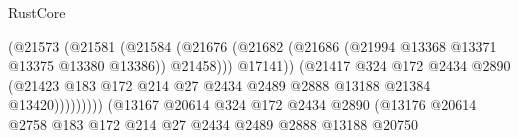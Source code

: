 \begin{lexlean}{RustCore}
\begin{coremodule}
                                                (@21573
                                                  (@21581
                                                    (@21584
                                                      (@21676
                                                        (@21682
                                                          (@21686
                                                            (@21994
                                                              @13368
                                                              @13371
                                                              @13375
                                                              @13380
                                                              @13386))
                                                          @21458)))
                                                    @17141))
                                                (@21417
                                                  @324
                                                  @172
                                                  @2434
                                                  @2890
                                                  (@21423
                                                    @183
                                                    @172
                                                    @214
                                                    @27
                                                    @2434
                                                    @2489
                                                    @2888
                                                    @13188
                                                    @21384
                                                    @13420)))))))))
                                  (@13167
                                    @20614
                                    @324
                                    @172
                                    @2434
                                    @2890
                                    (@13176
                                      @20614
                                      @2758
                                      @183
                                      @172
                                      @214
                                      @27
                                      @2434
                                      @2489
                                      @2888
                                      @13188
                                      @20750

\end{coremodule}
\end{lexlean}
